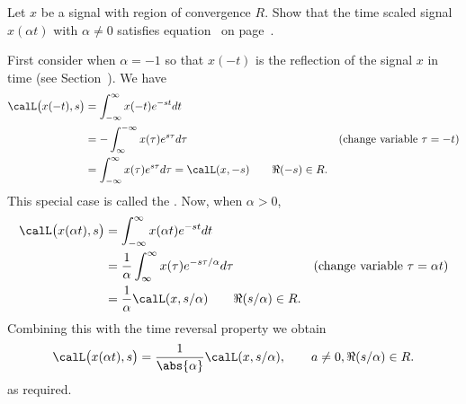 \begin{excersizelist}
\item \label{excer:timescalelaplace} Let $x$ be a signal with region of convergence $R$.  Show that the time scaled signal $x(\alpha t)$ with $\alpha \neq 0$ satisfies equation~ on page~.
\begin{solution}
First consider when $\alpha = -1$ so that $x(-t)$ is the reflection of the signal $x$ in time (see Section~).  We have 
\begin{align*}
 \calL\big( x(-t), s \big) &=  \int_{-\infty}^{\infty} x(-t)  e^{-s t} dt \\
 &=  -\int_{\infty}^{-\infty} x(\tau)  e^{s\tau} d\tau & \text{(change variable $\tau = -t$)}\\
 &=  \int_{-\infty}^{\infty} x(\tau)  e^{ s \tau} d\tau = \calL(x, -s) \qquad \Re(-s) \in R.
 \end{align*}
 This special case is called the .  Now, when $\alpha > 0$,
 \begin{align*}
 \calL\big( x(\alpha t), s \big) &=  \int_{-\infty}^{\infty} x(\alpha t)  e^{-s t} dt \\
 &=  \frac{1}{\alpha} \int_{\infty}^{\infty} x(\tau)  e^{-s \tau / \alpha}  d\tau & \text{(change variable $\tau = \alpha t$)}\\
 &= \frac{1}{\alpha} \calL(x, s / \alpha) \qquad \Re(s/\alpha) \in R.
 \end{align*}
Combining this with the time reversal property we obtain
 \[
 \calL\big(x(\alpha t),s\big) = \frac{1}{\abs{\alpha}} \calL(x, s/\alpha), \qquad a \neq 0, \Re(s/\alpha) \in R.
 \]
as required.
\end{solution}


\end{excersizelist}
